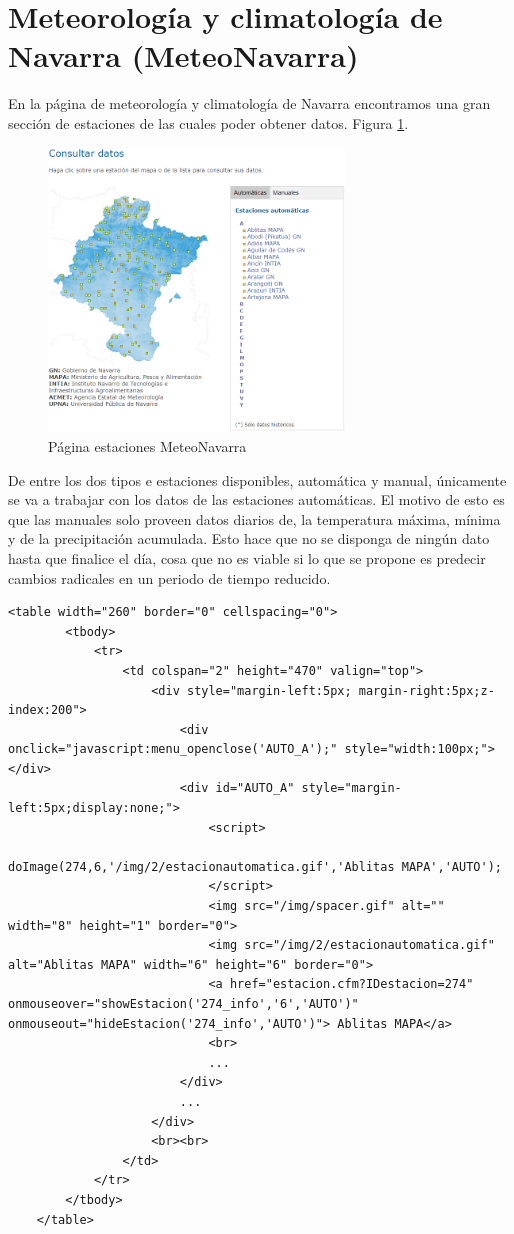 \section{Meteorología y climatología de Navarra (MeteoNavarra)}
En la página de meteorología y climatología de Navarra encontramos una gran sección de estaciones de las cuales poder obtener datos. Figura \ref{fig:ej27}.

\begin{figure} [H]
	\centering
	\includegraphics[width=0.7\textwidth]{fig/MeteoNavarraCode.png}
	\caption[Página estaciones MeteoNavarra]{Página estaciones MeteoNavarra}
	\label{fig:ej27}
\end{figure}

De entre los dos tipos e estaciones disponibles, automática y manual, únicamente se va a trabajar con los datos de las estaciones automáticas. El motivo de esto es que las manuales solo proveen datos diarios de, la temperatura máxima, mínima y de la precipitación acumulada. Esto hace que no se disponga de ningún dato hasta que finalice el día, cosa que no es viable si lo que se propone es predecir cambios radicales en un periodo de tiempo reducido.

\begin{lstlisting}[basicstyle=\footnotesize, caption={HTML tabla estaciones en MeteoNavarra}]
	<table width="260" border="0" cellspacing="0">
		<tbody>
			<tr>
				<td colspan="2" height="470" valign="top">
					<div style="margin-left:5px; margin-right:5px;z-index:200">
						<div onclick="javascript:menu_openclose('AUTO_A');" style="width:100px;"></div>
						<div id="AUTO_A" style="margin-left:5px;display:none;">
							<script>
								doImage(274,6,'/img/2/estacionautomatica.gif','Ablitas MAPA','AUTO');
							</script>
							<img src="/img/spacer.gif" alt="" width="8" height="1" border="0">
							<img src="/img/2/estacionautomatica.gif" alt="Ablitas MAPA" width="6" height="6" border="0">
							<a href="estacion.cfm?IDestacion=274" onmouseover="showEstacion('274_info','6','AUTO')" onmouseout="hideEstacion('274_info','AUTO')"> Ablitas MAPA</a>
							<br>
							...
						</div>
						...
					</div>
					<br><br>
				</td>
			</tr>
		</tbody>
	</table>
\end{lstlisting}

